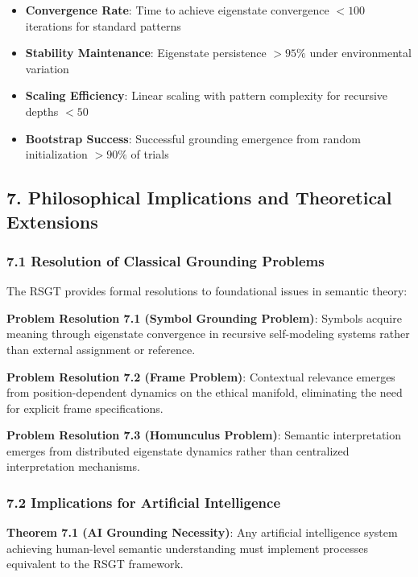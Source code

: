 \documentclass[
]{article}
\providecommand{\tightlist}{%
  \setlength{\itemsep}{0pt}\setlength{\parskip}{0pt}}
\begin{document}
\begin{itemize}
\tightlist
\item
  \textbf{Convergence Rate}: Time to achieve eigenstate convergence
  \(< 100\) iterations for standard patterns
\item
  \textbf{Stability Maintenance}: Eigenstate persistence \(> 95\%\)
  under environmental variation
\item
  \textbf{Scaling Efficiency}: Linear scaling with pattern complexity
  for recursive depths \(< 50\)
\item
  \textbf{Bootstrap Success}: Successful grounding emergence from random
  initialization \(> 90\%\) of trials
\end{itemize}

\subsection{7. Philosophical Implications and Theoretical
Extensions}\label{philosophical-implications-and-theoretical-extensions}

\subsubsection{7.1 Resolution of Classical Grounding
Problems}\label{resolution-of-classical-grounding-problems}

The RSGT provides formal resolutions to foundational issues in semantic
theory:

\textbf{Problem Resolution 7.1 (Symbol Grounding Problem)}: Symbols
acquire meaning through eigenstate convergence in recursive
self-modeling systems rather than external assignment or reference.

\textbf{Problem Resolution 7.2 (Frame Problem)}: Contextual relevance
emerges from position-dependent dynamics on the ethical manifold,
eliminating the need for explicit frame specifications.

\textbf{Problem Resolution 7.3 (Homunculus Problem)}: Semantic
interpretation emerges from distributed eigenstate dynamics rather than
centralized interpretation mechanisms.

\subsubsection{7.2 Implications for Artificial
Intelligence}\label{implications-for-artificial-intelligence}

\textbf{Theorem 7.1 (AI Grounding Necessity)}: Any artificial
intelligence system achieving human-level semantic understanding must
implement processes equivalent to the RSGT framework.
\end{document}
